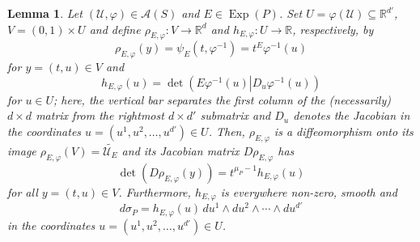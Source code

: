 \documentclass[11pt]{article}
\newtheorem{lemma}[theorem]{Lemma}
\newcommand\Exp{\operatorname{Exp}}
\renewcommand\det{\operatorname{det}}
\begin{document}
\begin{lemma}\label{lem:JacobianRelation}
Let $(\mathcal{U},\varphi)\in \mathcal{A}(S)$ and $E\in\Exp(P)$. Set $U=\varphi(\mathcal{U})\subseteq\mathbb{R}^{d'}$, $V=(0,1)\times U$ and define $\rho_{E,\varphi}:V\to \mathbb{R}^d$ and $h_{E,\varphi}:U\to \mathbb{R}$, respectively, by
\begin{equation*}
    \rho_{E,\varphi}(y)=\psi_E(t,\varphi^{-1})=t^E\varphi^{-1}(u)
\end{equation*}
for $y=(t,u)\in V$ and
\begin{equation*}
    h_{E,\varphi}(u)=\det\left.\left(E\varphi^{-1}(u)\right\vert D_u\varphi^{-1}(u)\right)
\end{equation*}
for $u\in U$; here, the vertical bar separates the first column of the (necessarily) $d\times d$ matrix from the rightmost $d\times d'$ submatrix and $D_u$ denotes the Jacobian in the coordinates $u=(u^1,u^2,\dots,u^{d'})\in U$. Then, $\rho_{E,\varphi}$ is a diffeomorphism onto its image $\rho_{E,\varphi}(V)=\widetilde{\mathcal{U}_E}$ and its Jacobian matrix $D\rho_{E,\varphi}$ has
\begin{equation}\label{eq:JacobianRelation1}
    \det(D\rho_{E,\varphi}(y))=t^{\mu_P-1}h_{E,\varphi}(u)
\end{equation}
for all $y=(t,u)\in V$. Furthermore, $h_{E,\varphi}$ is everywhere non-zero, smooth and
\begin{equation}\label{eq:JacobianRelation2}
    d\sigma_P=h_{E,\varphi}(u)\,du^1\wedge du^2\wedge\cdots\wedge du^{d'}
\end{equation}
in the coordinates $u=(u^1,u^2,\dots,u^{d'})\in U$. 
\end{lemma}
\end{document}
